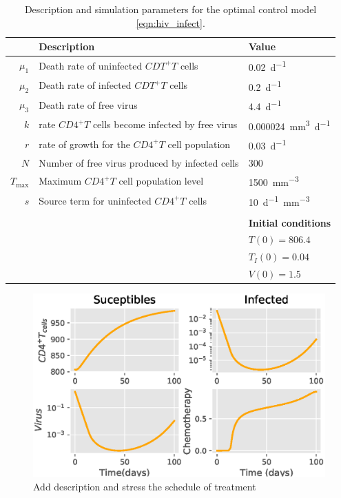 \begin{table}
	\centering
	\begin{tabular}{rll}
		\toprule
			&\textbf{Description} & \textbf{Value}
            \\
        \midrule
		$\mu_1$ 
        	& Death rate of uninfected $CDT^+T$ cells
        	& \SI{0.02}{d^{-1}} 
            \\
		$\mu_2$ 
       		& Death rate of infected $CDT^+T$ cells
		    & \SI{0.2}{d^{-1}}
			\\
		$\mu_3$ 
      		& Death rate of free virus
		    & \SI{4.4}{d^{-1}}
            \\
        $k$ 
        	& rate $CD4^+T$ cells become infected by free virus
        	& \SI{0.000024}{\milli\meter^3 d^{-1}}
 			\\
		$r$ 
			& rate of growth for the $CD4^+T$ cell population
			& \SI{0.03}{d^{-1}}
     	    \\
     	$N$ 
     		& Number of free virus produced by infected cells
     		& \num{300}
            \\
     	$T_{\max{}}$ 
     		& Maximum $CD4^+T$ cell population level
     		& \SI{1500}{\milli \meter ^ {-3}}
     		\\
     	$s$ 
     		& Source term for uninfected $CD4^{+}T$ cells
     		& \SI{10}{d^{-1}\milli \meter ^{-3}}
		\\
		\\
	    &&
	    \textbf{Initial conditions}
	    \\
	    \cmidrule{3-3}
	    && $T(0) = \num{806.4}$
	    \\
	    && $T_{I}(0)=\num{0.04}$
	    \\
	    && $V(0)= \num{1.5}$
	    \\
		\bottomrule
    \end{tabular}
	\caption{
		Description and simulation parameters for the optimal control model
		\eqref{eqn:hiv_infect}.
	}
	\label{tbl:hiv_infect}
\end{table}
\begin{figure}[tbh]
\centering
	\includegraphics{Figures/hiv_chemotherapy_fig_01}
	\caption{Add description and stress the schedule of treatment}
	\label{fig:hivchemotherapyfig01}
\end{figure}
